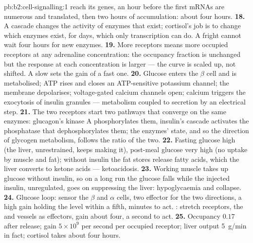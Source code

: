 \begin{solution}{pb:b2:cell-signalling:1}
reach its genes, an hour before the first mRNAs are numerous and
translated, then two hours of accumulation: about four hours.
\textbf{18.} A cascade changes the activity of enzymes that exist;
cortisol's job is to change which enzymes exist, for days, which
only transcription can do. A fright cannot wait four hours for new
enzymes.
\textbf{19.} More receptors means more occupied receptors at any
adrenaline concentration: the occupancy fraction is unchanged but
the response at each concentration is larger --- the curve is
scaled up, not shifted. A slow  sets the gain of a fast one.
\textbf{20.} Glucose enters the $\beta$ cell and is metabolised; ATP
rises and closes an ATP-sensitive potassium channel; the membrane
depolarises; voltage-gated calcium channels open; calcium triggers
the exocytosis of insulin granules --- metabolism coupled to
secretion by an electrical step.
\textbf{21.} The two receptors start two pathways that converge on
the same enzymes: glucagon's kinase A phosphorylates them, insulin's
cascade activates the phosphatase that dephosphorylates them; the
enzymes' state, and so the direction of glycogen metabolism, follows
the ratio of the two.
\textbf{22.} Fasting glucose high (the liver, unrestrained, keeps
making it), post-meal glucose very high (no uptake by muscle and
fat); without insulin the fat stores release fatty acids, which the
liver converts to ketone acids --- ketoacidosis.
\textbf{23.} Working muscle takes up glucose without insulin, so on a
long run the glucose falls while the injected insulin, unregulated,
goes on suppressing the liver: hypoglycaemia and collapse.
\textbf{24.} Glucose loop: sensor the $\beta$ and $\alpha$ cells,
two effector  for the two directions, a high gain holding
the level within a fifth, minutes to act. : stretch
receptors, the  and vessels as effectors, gain about four, a
second to act.
\textbf{25.} Occupancy $0.17$ after release; gain $5\times 10^{9}$ per second
per occupied receptor; liver output \qty{5}{g/min} in fact; cortisol
takes about four hours.
\end{solution}
